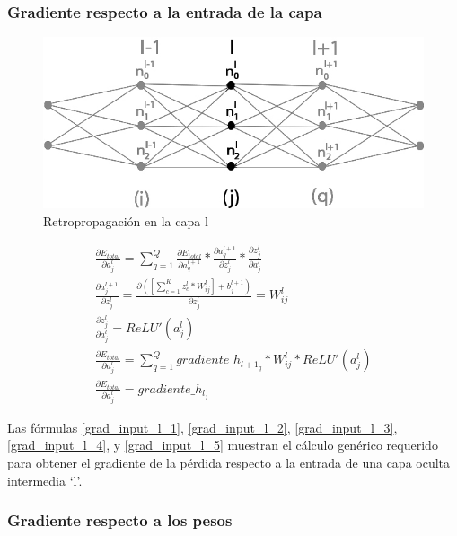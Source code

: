 \subsubsection{Gradiente respecto a la entrada de la capa}

\begin{figure}[H]
	\centering
	\includegraphics[scale=0.35]{imagenes/conclusion_capa_l.jpg}  
	\caption{Retropropagación en la capa l}
	\label{fig:conclusion_capa_l}
\end{figure}

\begin{gather}
	\frac{\partial E_{total}}{\partial a^l_j} = \sum_{q=1}^Q \frac{\partial E_{total}}{\partial a^{l+1}_q} * \frac{\partial a^{l+1}_q}{\partial z^l_j} * \frac{\partial z^l_j}{\partial a^l_j} \label{grad_input_l_1} \\
	\frac{\partial a^{l+1}_j }{\partial z^l_j } = \frac{\partial ([\sum_{c=1}^{K} z^l_c * W^l_{ij}] + b^{l+1}_j) }{\partial z^l_j } = W^l_{ij} \label{grad_input_l_2} \\
	\frac{\partial z^l_j}{\partial a^l_j} = ReLU'(a^l_j) \label{grad_input_l_3} \\
	\frac{\partial E_{total}}{\partial a^l_j} = \sum_{q=1}^Q  gradiente\_h_{{l+1}_q} * W^l_{ij} * ReLU'(a^l_j) \label{grad_input_l_4} \\
	\frac{\partial E_{total}}{\partial a^l_j} = gradiente\_h_{l_j} \label{grad_input_l_5}
\end{gather}

Las fórmulas \ref{grad_input_l_1}, \ref{grad_input_l_2}, \ref{grad_input_l_3},  \ref{grad_input_l_4}, y \ref{grad_input_l_5} muestran el cálculo genérico requerido para obtener el gradiente de la pérdida respecto a la entrada de una capa oculta intermedia `l'.

\subsubsection{Gradiente respecto a los pesos}

